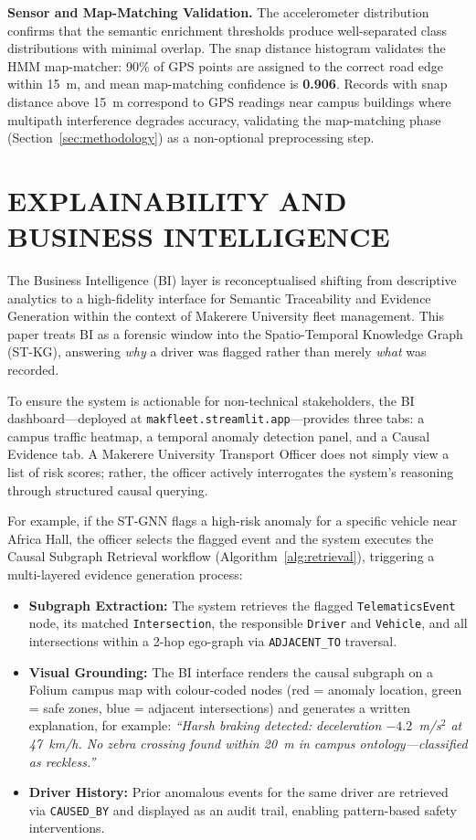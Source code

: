 \documentclass{ieeeaccess}
\begin{document}
\textbf{Sensor and Map-Matching Validation.}
The accelerometer distribution confirms that the semantic enrichment
thresholds produce well-separated class distributions with minimal
overlap. The snap distance histogram validates the HMM map-matcher:
90\% of GPS points are assigned to the correct road edge within 15~m,
and mean map-matching confidence is \textbf{0.906}. Records with snap
distance above 15~m correspond to GPS readings near campus buildings
where multipath interference degrades accuracy, validating the
map-matching phase (Section~\ref{sec:methodology}) as a non-optional
preprocessing step.



\section{EXPLAINABILITY AND BUSINESS INTELLIGENCE}

The Business Intelligence (BI) layer is reconceptualised shifting from
descriptive analytics to a high-fidelity interface for Semantic
Traceability and Evidence Generation within the context of Makerere
University fleet management. This paper treats BI as a forensic window
into the Spatio-Temporal Knowledge Graph (ST-KG), answering \emph{why}
a driver was flagged rather than merely \emph{what} was recorded.

To ensure the system is actionable for non-technical stakeholders, the
BI dashboard---deployed at
\texttt{makfleet.streamlit.app}---provides three tabs: a campus
traffic heatmap, a temporal anomaly detection panel, and a Causal
Evidence tab. A Makerere University Transport Officer does not simply
view a list of risk scores; rather, the officer actively interrogates
the system's reasoning through structured causal querying.

For example, if the ST-GNN flags a high-risk anomaly for a specific
vehicle near Africa Hall, the officer selects the flagged event and
the system executes the Causal Subgraph Retrieval workflow
(Algorithm~\ref{alg:retrieval}), triggering a multi-layered evidence
generation process:
\begin{itemize}
  \item \textbf{Subgraph Extraction:} The system retrieves the
  flagged \texttt{TelematicsEvent} node, its matched
  \texttt{Intersection}, the responsible \texttt{Driver} and
  \texttt{Vehicle}, and all intersections within a 2-hop ego-graph
  via \texttt{ADJACENT\_TO} traversal.
  \item \textbf{Visual Grounding:} The BI interface renders the
  causal subgraph on a Folium campus map with colour-coded nodes
  (red = anomaly location, green = safe zones, blue = adjacent
  intersections) and generates a written explanation, for example:
  \emph{``Harsh braking detected: deceleration $-4.2$~m/s$^2$ at
  47~km/h. No zebra crossing found within 20~m in campus
  ontology---classified as reckless.''}
  \item \textbf{Driver History:} Prior anomalous events for the
  same driver are retrieved via \texttt{CAUSED\_BY} and displayed
  as an audit trail, enabling pattern-based safety interventions.
\end{itemize}
\end{document}
